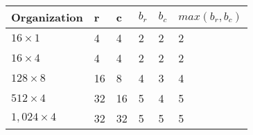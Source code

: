 \documentclass{article}
\begin{document}
\begin{tabular}{l l l l l l}
	Organization & r & c & $b_r$ & $b_c$ & $max(b_r, b_c)$ \\
	\hline
	$16 \times 1$ & 4 & 4 & 2 & 2 & 2 \\
	$16 \times 4$ & 4 & 4 & 2 & 2 & 2 \\
	$128 \times 8$ & 16 & 8 & 4 & 3 & 4 \\
	$512 \times 4$ & 32 & 16 & 5 & 4 & 5 \\
	$1,024 \times 4$ & 32 & 32 & 5 & 5 & 5 \\
	\hline
\end{tabular}
\end{document}

